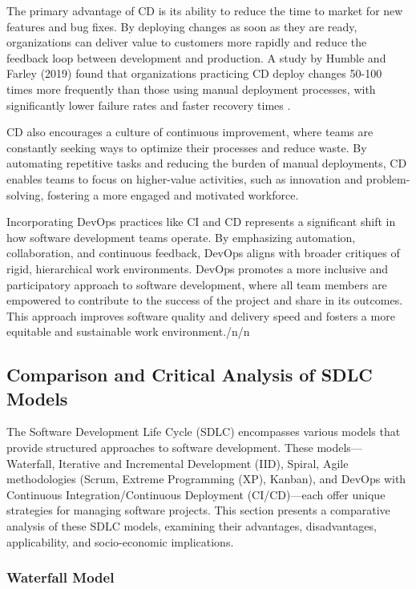 \begin{refsection}
The primary advantage of CD is its ability to reduce the time to market for new features and bug fixes. By deploying changes as soon as they are ready, organizations can deliver value to customers more rapidly and reduce the feedback loop between development and production. A study by Humble and Farley (2019) found that organizations practicing CD deploy changes 50-100 times more frequently than those using manual deployment processes, with significantly lower failure rates and faster recovery times \cite[pp.~91-120]{humble2019continuous}.

CD also encourages a culture of continuous improvement, where teams are constantly seeking ways to optimize their processes and reduce waste. By automating repetitive tasks and reducing the burden of manual deployments, CD enables teams to focus on higher-value activities, such as innovation and problem-solving, fostering a more engaged and motivated workforce.

Incorporating DevOps practices like CI and CD represents a significant shift in how software development teams operate. By emphasizing automation, collaboration, and continuous feedback, DevOps aligns with broader critiques of rigid, hierarchical work environments. DevOps promotes a more inclusive and participatory approach to software development, where all team members are empowered to contribute to the success of the project and share in its outcomes. This approach improves software quality and delivery speed and fosters a more equitable and sustainable work environment./n/n\subsection{Comparison and Critical Analysis of SDLC Models}

The Software Development Life Cycle (SDLC) encompasses various models that provide structured approaches to software development. These models—Waterfall, Iterative and Incremental Development (IID), Spiral, Agile methodologies (Scrum, Extreme Programming (XP), Kanban), and DevOps with Continuous Integration/Continuous Deployment (CI/CD)—each offer unique strategies for managing software projects. This section presents a comparative analysis of these SDLC models, examining their advantages, disadvantages, applicability, and socio-economic implications.

\subsubsection{Waterfall Model}


\end{refsection}
